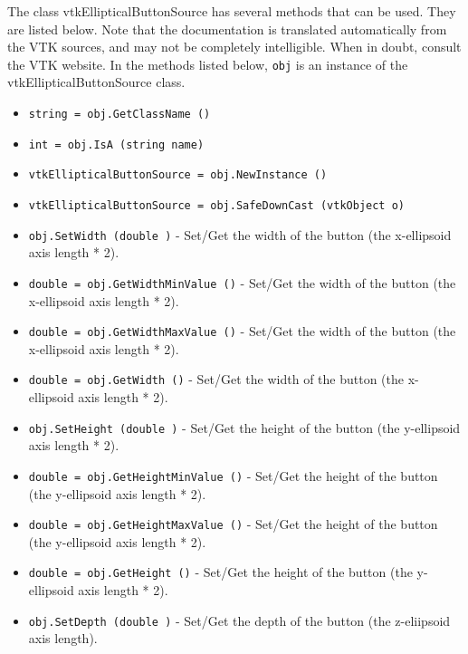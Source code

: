 The class vtkEllipticalButtonSource has several methods that can be used.
  They are listed below.
Note that the documentation is translated automatically from the VTK sources,
and may not be completely intelligible.  When in doubt, consult the VTK website.
In the methods listed below, \verb|obj| is an instance of the vtkEllipticalButtonSource class.
\begin{itemize}
\item  \verb|string = obj.GetClassName ()|

\item  \verb|int = obj.IsA (string name)|

\item  \verb|vtkEllipticalButtonSource = obj.NewInstance ()|

\item  \verb|vtkEllipticalButtonSource = obj.SafeDownCast (vtkObject o)|

\item  \verb|obj.SetWidth (double )| -  Set/Get the width of the button (the x-ellipsoid axis length * 2).

\item  \verb|double = obj.GetWidthMinValue ()| -  Set/Get the width of the button (the x-ellipsoid axis length * 2).

\item  \verb|double = obj.GetWidthMaxValue ()| -  Set/Get the width of the button (the x-ellipsoid axis length * 2).

\item  \verb|double = obj.GetWidth ()| -  Set/Get the width of the button (the x-ellipsoid axis length * 2).

\item  \verb|obj.SetHeight (double )| -  Set/Get the height of the button (the y-ellipsoid axis length * 2).

\item  \verb|double = obj.GetHeightMinValue ()| -  Set/Get the height of the button (the y-ellipsoid axis length * 2).

\item  \verb|double = obj.GetHeightMaxValue ()| -  Set/Get the height of the button (the y-ellipsoid axis length * 2).

\item  \verb|double = obj.GetHeight ()| -  Set/Get the height of the button (the y-ellipsoid axis length * 2).

\item  \verb|obj.SetDepth (double )| -  Set/Get the depth of the button (the z-eliipsoid axis length).


\end{itemize}
